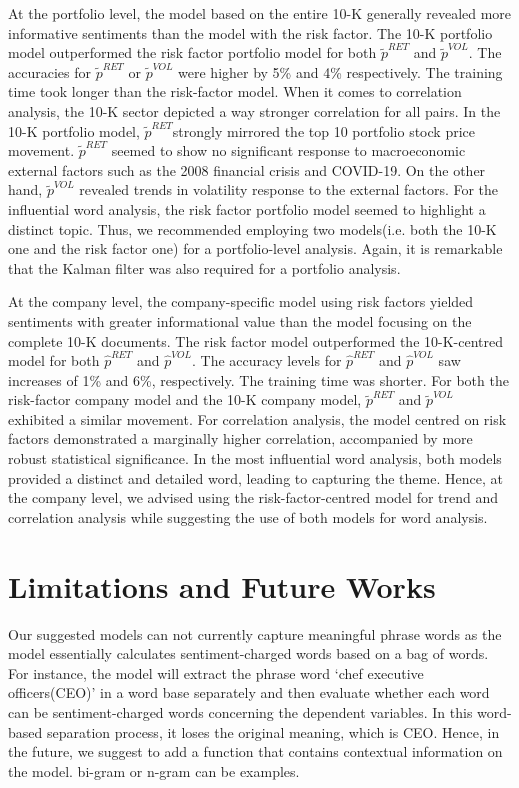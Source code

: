\documentclass[logo,bsc,singlespacing,parskip]{infthesis}
\begin{document}
At the portfolio level, the model based on the entire 10-K generally revealed more informative sentiments than the model with the risk factor. The 10-K portfolio model outperformed the risk factor portfolio model for both $\tilde{p}^{RET}$ and $\tilde{p}^{VOL}$. The accuracies for $\tilde{p}^{RET}$ or $\tilde{p}^{VOL}$ were higher by 5\% and 4\% respectively. The training time took longer than the risk-factor model. When it comes to correlation analysis, the 10-K sector depicted a way stronger correlation for all pairs. In the 10-K portfolio model, $\tilde{p}^{RET}$strongly mirrored the top 10 portfolio stock price movement. $\tilde{p}^{RET}$ seemed to show no significant response to macroeconomic external factors such as the 2008 financial crisis and COVID-19. On the other hand, $\tilde{p}^{VOL}$ revealed trends in volatility response to the external factors. For the influential word analysis, the risk factor portfolio model seemed to highlight a distinct topic. Thus, we recommended employing two models(i.e. both the 10-K one and the risk factor one) for a portfolio-level analysis. Again, it is remarkable that the Kalman filter was also required for a portfolio analysis. 

At the company level, the company-specific model using risk factors yielded sentiments with greater informational value than the model focusing on the complete 10-K documents. The risk factor model outperformed the 10-K-centred model for both $\hat{p}^{RET}$ and $\hat{p}^{VOL}$. The accuracy levels for $\hat{p}^{RET}$ and $\hat{p}^{VOL}$ saw increases of 1\% and 6\%, respectively. The training time was shorter. For both the risk-factor company model and the 10-K company model, $\tilde{p}^{RET}$ and $\tilde{p}^{VOL}$ exhibited a similar movement. For correlation analysis, the model centred on risk factors demonstrated a marginally higher correlation, accompanied by more robust statistical significance. In the most influential word analysis, both models provided a distinct and detailed word, leading to capturing the theme. Hence, at the company level, we advised using the risk-factor-centred model for trend and correlation analysis while suggesting the use of both models for word analysis.

\section{Limitations and Future Works}

Our suggested models can not currently capture meaningful phrase words as the model essentially calculates sentiment-charged words based on a bag of words. For instance, the model will extract the phrase word ‘chef executive officers(CEO)’ in a word base separately and then evaluate whether each word can be sentiment-charged words concerning the dependent variables. In this word-based separation process, it loses the original meaning, which is CEO. Hence, in the future, we suggest to add a function that contains contextual information on the model. bi-gram or n-gram can be examples. 
\end{document}
